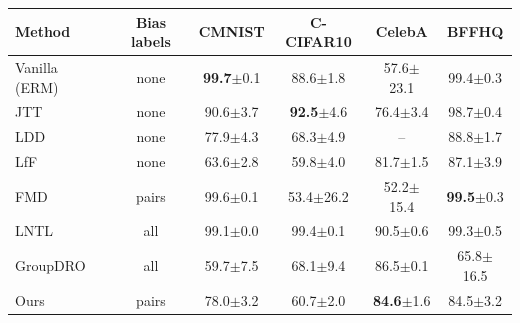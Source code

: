 \begin{tabular}{lccccc}
\toprule
Method & Bias labels & CMNIST & C-CIFAR10 & CelebA & BFFHQ \\
\midrule
Vanilla (ERM) & none & \textbf{99.7}{\scriptsize$\pm$0.1} & 88.6{\scriptsize$\pm$1.8} & 57.6{\scriptsize$\pm$23.1} & 99.4{\scriptsize$\pm$0.3} \\
JTT~\cite{liu2021jtt} & none & 90.6{\scriptsize$\pm$3.7} & \textbf{92.5}{\scriptsize$\pm$4.6} & 76.4{\scriptsize$\pm$3.4} & 98.7{\scriptsize$\pm$0.4} \\
LDD~\cite{lee2021ldd} & none & 77.9{\scriptsize$\pm$4.3} & 68.3{\scriptsize$\pm$4.9} & – & 88.8{\scriptsize$\pm$1.7} \\
LfF~\cite{nam2020lff} & none & 63.6{\scriptsize$\pm$2.8} & 59.8{\scriptsize$\pm$4.0} & 81.7{\scriptsize$\pm$1.5} & 87.1{\scriptsize$\pm$3.9} \\
FMD~\cite{chen2023fmd} & pairs & 99.6{\scriptsize$\pm$0.1} & 53.4{\scriptsize$\pm$26.2} & 52.2{\scriptsize$\pm$15.4} & \textbf{99.5}{\scriptsize$\pm$0.3} \\
LNTL~\cite{kim2019lntl} & all & 99.1{\scriptsize$\pm$0.0} & 99.4{\scriptsize$\pm$0.1} & 90.5{\scriptsize$\pm$0.6} & 99.3{\scriptsize$\pm$0.5} \\
GroupDRO~\cite{sagawa2020groupdro} & all & 59.7{\scriptsize$\pm$7.5} & 68.1{\scriptsize$\pm$9.4} & 86.5{\scriptsize$\pm$0.1} & 65.8{\scriptsize$\pm$16.5} \\
Ours & pairs & 78.0{\scriptsize$\pm$3.2} & 60.7{\scriptsize$\pm$2.0} & \textbf{84.6}{\scriptsize$\pm$1.6} & 84.5{\scriptsize$\pm$3.2} \\
\bottomrule
\end{tabular}
